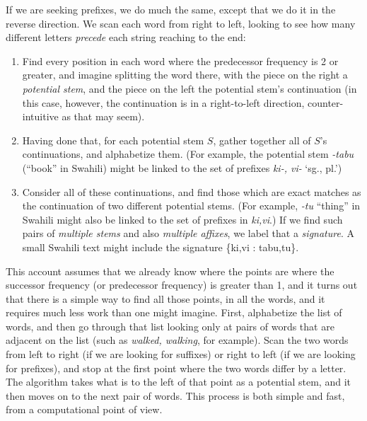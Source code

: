 \documentclass[output=paper,colorlinks,citecolor=brown]{langscibook}
\begin{document}
If we are seeking prefixes, we do much the same, except that we do it in the reverse direction. We scan each word from right to left, looking to see how many different letters \textit{precede} each string reaching to the end:

\begin{enumerate}
\item  Find every position in each word where the predecessor frequency is 2 or greater, and imagine splitting the word there, with the piece on the right a \textit{potential stem}, and the piece on the left the potential stem's continuation (in this case, however, the continuation is in a right-to-left direction, counter-intuitive as that may seem).

\item  Having done that, for each potential stem $S$, gather together all of $S$'s continuations, and alphabetize them. (For example, the potential stem \textit{-tabu} (``book'' in Swahili) might be linked to the set of prefixes \textit{ki-, vi-} `sg., pl.') 

\item  Consider all of these continuations, and find those which are exact matches as the continuation of two different potential stems. (For example, \textit{-tu} ``thing'' in Swahili might also be linked to the set of prefixes in \textit{ki,vi}.) If we find such pairs of \textit{multiple stems} and also \textit{multiple affixes}, we label that a \textit{signature}.  A small Swahili text might include the signature \{ki,vi : tabu,tu\}.
\end{enumerate}

 


This account assumes that we already know where the points are where the successor frequency (or predecessor frequency) is greater than 1, and it turns out that there is a simple way to find all those points, in all the words, and it requires much less work than one might imagine. First, alphabetize the list of words, and then go through that list looking only at pairs of words that are adjacent on the list (such as \textit{walked, walking}, for example). Scan the two words from left to right (if we are looking for suffixes) or right to left (if we are looking for prefixes), and stop at the first point where the two words differ by a letter. The algorithm takes what is to the left of that point as a potential stem, and it then moves on to the next pair of words. This process is both simple and fast, from a computational point of view.
\end{document}
